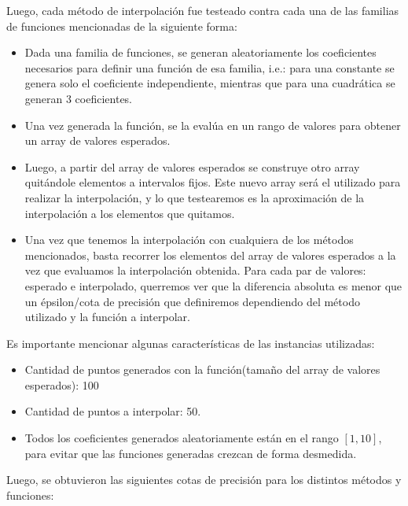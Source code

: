 Luego, cada método de interpolación fue testeado contra cada una de las familias de funciones mencionadas de la siguiente forma:
\begin{itemize}
  \item Dada una familia de funciones, se generan aleatoriamente los coeficientes necesarios para definir una función de esa familia, i.e.: para una constante se genera solo el coeficiente independiente, mientras que para una cuadrática se generan 3 coeficientes.
    \item Una vez generada la función, se la evalúa en un rango de valores para obtener un array de valores esperados.
    \item Luego, a partir del array de valores esperados se construye otro array quitándole elementos a intervalos fijos.
        Este nuevo array será el utilizado para realizar la interpolación, y lo que testearemos es la aproximación de  la
        interpolación a los elementos que quitamos.
    \item Una vez que tenemos la interpolación con cualquiera de los métodos mencionados, basta recorrer los elementos del array de valores esperados a la vez que evaluamos la interpolación obtenida.
        Para cada par de valores: esperado e interpolado, querremos ver que la diferencia absoluta es menor que un épsilon/cota de precisión que
        definiremos dependiendo del método utilizado y la función a interpolar.
\end{itemize}

Es importante mencionar algunas características de las instancias utilizadas:
\begin{itemize}
    \item Cantidad de puntos generados con la función(tamaño del array de valores esperados): 100
    \item Cantidad de puntos a interpolar: 50.
    \item Todos los coeficientes generados aleatoriamente están en el rango $[1,10]$,
        para evitar que las funciones generadas crezcan de forma desmedida.
\end{itemize}

Luego, se obtuvieron las siguientes cotas de precisión para los distintos métodos y funciones:

